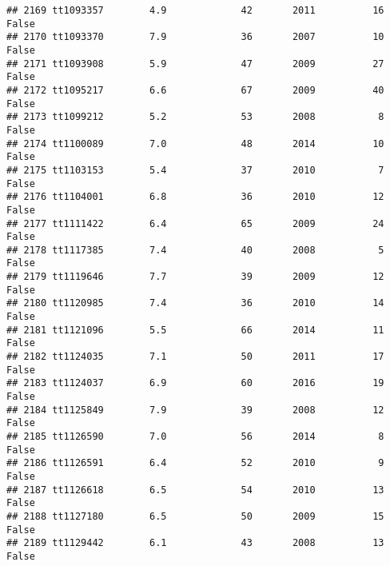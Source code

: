 \documentclass[
]{article}
\begin{document}
\begin{verbatim}
## 2169 tt1093357        4.9             42       2011          16   False
## 2170 tt1093370        7.9             36       2007          10   False
## 2171 tt1093908        5.9             47       2009          27   False
## 2172 tt1095217        6.6             67       2009          40   False
## 2173 tt1099212        5.2             53       2008           8   False
## 2174 tt1100089        7.0             48       2014          10   False
## 2175 tt1103153        5.4             37       2010           7   False
## 2176 tt1104001        6.8             36       2010          12   False
## 2177 tt1111422        6.4             65       2009          24   False
## 2178 tt1117385        7.4             40       2008           5   False
## 2179 tt1119646        7.7             39       2009          12   False
## 2180 tt1120985        7.4             36       2010          14   False
## 2181 tt1121096        5.5             66       2014          11   False
## 2182 tt1124035        7.1             50       2011          17   False
## 2183 tt1124037        6.9             60       2016          19   False
## 2184 tt1125849        7.9             39       2008          12   False
## 2185 tt1126590        7.0             56       2014           8   False
## 2186 tt1126591        6.4             52       2010           9   False
## 2187 tt1126618        6.5             54       2010          13   False
## 2188 tt1127180        6.5             50       2009          15   False
## 2189 tt1129442        6.1             43       2008          13   False
## 2190 tt1130080        6.4             46       2009          14   False
## 2191 tt1130884        8.1             68       2010          14   False
## 2192 tt1131729        7.4             53       2009          12   False
## 2193 tt1131734        5.2             41       2009          15   False
## 2194 tt1132620        7.8             48       2009          31   False
## 2195 tt1133985        5.5             68       2011          13   False
## 2196 tt1135487        6.1             53       2009           9   False
## 2197 tt1135503        7.0             68       2009          13   False
## 2198 tt1136608        7.9             30       2009          10   False
## 2199 tt1137450        6.4             46       2018          10   False
## 2200 tt1139328        7.2             77       2010          16   False
## 2201 tt1139668        4.8             44       2009          10   False
## 2202 tt1139797        7.9             43       2008          20   False
## 2203 tt1142977        6.9             54       2012          13   False

\end{verbatim}
\end{document}
